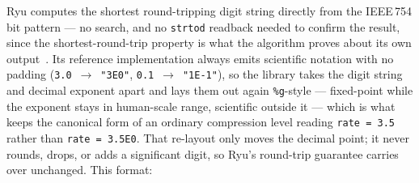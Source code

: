 \documentclass[../RFC-HDFG-2026-001.tex]{subfiles}
\begin{document}
Ryu computes the shortest round-tripping digit string directly from the
IEEE\,754 bit pattern --- no search, and no \texttt{strtod} readback needed to
confirm the result, since the shortest-round-trip property is what the
algorithm proves about its own output~\cite{ryupaper}.  Its reference
implementation always emits scientific notation with no padding
(\texttt{3.0}~$\to$~\texttt{"3E0"}, \texttt{0.1}~$\to$~\texttt{"1E-1"}), so the
library takes the digit string and decimal exponent apart and lays them out
again \texttt{\%g}-style --- fixed-point while the exponent stays in
human-scale range, scientific outside it --- which is what keeps the
canonical form of an ordinary compression level reading
\texttt{rate~=~3.5} rather than \texttt{rate~=~3.5E0}.  That re-layout only
moves the decimal point; it never rounds, drops, or adds a significant digit,
so Ryu's round-trip guarantee carries over unchanged.  This format:
\end{document}
